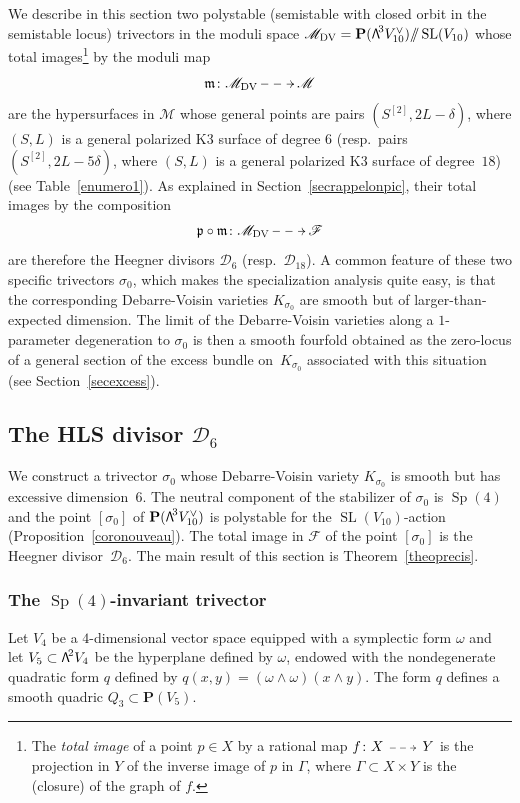 \documentclass[11pt]{article}
\makeatletter
\let\mathcal\mathscr
\newcommand{\dradpl}{{\!\!\xymatrix@C=8mm{\ar@{-->}[r]&}\!\!}}
\newcommand{\dratst}{{\,\mathrel{\scalebox{.8}{$\dradpl$}}\,}}
\newcommand{\drascst}{{\,\mathrel{\scalebox{.6}{$\dradpl$}}\,}}
\newcommand{\dra}{\mathchoice{\dradpl}{\dratst}{\drascst}{\drascst}}
\theoremstyle{definition}
\renewcommand\P{{\mathbf P}}\let\PP\P
\newcommand\cD{\mathcal{D}}
\newcommand\cF{\mathcal{F}}
\newcommand\cM{\mathcal{M}}
\newcommand\cMDV{\cM_{\mathrm{DV}}}
\newcommand\gp{\mathfrak p}
\newcommand{\gm}{\mathfrak{m}}
\let\dual\vee
\let\Ld L
\DeclareMathOperator{\Sp}{Sp}
\DeclareMathOperator{\SL}{SL}
\newcommand\bw[1]{{\hbox{\large$\mathsf{\Lambda}$}^{\!#1}}}
\newcommand\hilbS{S^{[2]}}
\newcommand{\gquot}{/\!\!/}
\renewcommand{\dratst}{\mathrel{\scalebox{.8}{$\dradpl$}}}
\renewcommand{\drascst}{\mathrel{\scalebox{.6}{$\dradpl$}}}
\makeatother
\begin{document}
We describe in this section two polystable (semistable with closed orbit in the semistable locus) trivectors in the moduli space
$\cMDV=\PP(\bw3 V_{10}^\dual) \gquot \SL(V_{10})
$ whose total images\footnote{The \emph{total image} of a point $p\in X$ by a rational map $f\colon X\dra Y$ is the projection in $Y$ of the inverse image of $p$ in $\Gamma$, where $\Gamma\subset X\times Y$ is the (closure) of the graph of $f$.} by the moduli map
\[
\gm\colon \cMDV\dra \cM
\]
are the hypersurfaces in $\cM$ whose general points are pairs $(\hilbS, 2\Ld- \delta)$, where $(S,L)$ is a general polarized K3 surface of degree 6 (resp.~pairs $(\hilbS, 2\Ld- 5\delta)$, where $(S,L)$ is a general polarized K3 surface of degree~$18$) (see Table~\ref{enumero1}). As explained in Section~\ref{secrappelonpic}, their total images
by the composition
\[
\gp\circ \gm\colon \cMDV\dra \cF
\]
are therefore the Heegner divisors $\cD_6$ (resp.~$\cD_{18}$).
A common feature of these two specific trivectors $\sigma_0$, which makes the specialization analysis
quite easy, is that the corresponding Debarre-Voisin varieties $K_{\sigma_0}$ are smooth but of larger-than-expected dimension. The limit
of the Debarre-Voisin varieties along a $1$-parameter degeneration to ${\sigma_0}$ is then
a smooth fourfold obtained as the zero-locus of a general section of the excess bundle on~$K_{\sigma_0}$ associated with this situation (see Section~\ref{secexcess}).

\subsection{The HLS divisor $\cD_{6}$}\label{sec51}
We construct a trivector $\sigma_0 $ whose
Debarre-Voisin variety $K_{\sigma_0}$ is smooth but has excessive dimension~$6$.
The neutral component of the stabilizer of $\sigma_0 $ is
$ \Sp(4)$ and the point $[\sigma_0]$ of $\P(\bw3V_{10}^\vee)$ is polystable for the $\SL(V_{10})$-action (Proposition~\ref{coronouveau}). The total image in $\cF$ of the point $[\sigma_0]$ is the Heegner divisor~$\cD_6$. The main result of this section is Theorem~\ref{theoprecis}.

\subsubsection{The $\Sp(4)$-invariant trivector}\label{sechivert}

Let $V_4$ be a $4$-dimensional vector space equipped with a symplectic form $\omega$ and let
$V_5\subset \bw2V_4 $ be the hyperplane defined by $\omega$, endowed with the nondegenerate quadratic form $q$ defined by $q(x,y)=(\omega \wedge\omega)(x\wedge y)$. The form $q$ defines a smooth quadric $Q_3\subset \P(V_5)$.
\end{document}
